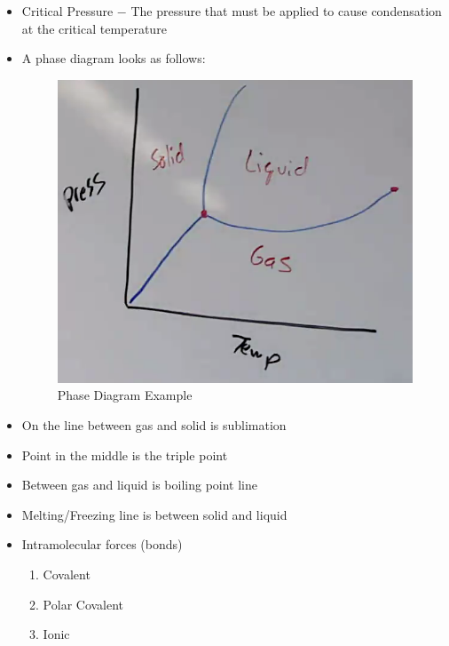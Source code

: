 \documentclass[12pt]{article}
\begin{document}
\begin{itemize}
\item Critical Pressure $-$ The pressure that must be applied to cause condensation at the critical temperature

\item A phase diagram looks as follows:

  \begin{figure}[H]
    \centering
    \includegraphics{Figures/PhaseDiagram.png}
    \caption{Phase Diagram Example}
    \label{fig:1}
  \end{figure}

\item On the line between gas and solid is sublimation

\item Point in the middle is the triple point

\item Between gas and liquid is boiling point line

\item Melting/Freezing line is between solid and liquid

\item Intramolecular forces (bonds)

  \begin{enumerate}

    \item Covalent

    \item Polar Covalent

    \item Ionic


\end{enumerate}
\end{itemize}
\end{document}

